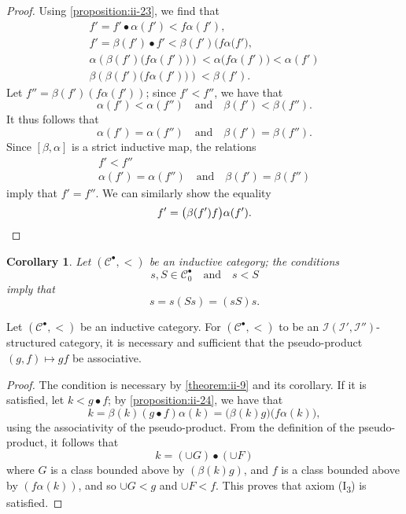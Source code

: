 \documentclass[a4paper,fleqn]{article}
\theoremstyle{plain}
\newenvironment{proposition}[1]
  {\renewcommand\theinnerproposition{#1}\innerproposition}
  {\endinnerproposition}
\newtheorem*{corollary*}{Corollary}
\theoremstyle{definition}
\newcommand{\oldpage}[1]{{\marginpar{\footnotesize$\bigg\vert$\,\,\,\,\textit{p.~#1}}}}
\newcommand{\textand}{\quad\text{and}\quad}
\newcommand{\CC}{\mathcal{C}}
\newcommand{\II}{\mathcal{I}}
\begin{document}
\begin{proof}
  Using \cref{proposition:ii-23}, we find that
  \[
    \begin{gathered}
      f'
      = f'\bullet\alpha(f')
      < f\alpha(f'),
    \\f'
      = \beta(f')\bullet f'
      < \beta(f')\big(f\alpha(f'\big),
    \\\alpha\left(\beta(f')\big(f\alpha(f')\big)\right)
      < \alpha\big(f\alpha(f')\big)
      < \alpha(f')
    \\\beta\left(\beta(f')\big(f\alpha(f')\big)\right)
      < \beta(f').
    \end{gathered}
  \]
  Let $f''=\beta(f')(f\alpha(f'))$;
  since $f'<f''$, we have that
  \[
    \alpha(f')<\alpha(f'')
    \textand
    \beta(f')<\beta(f'').
  \]
  It thus follows that
  \[
    \alpha(f')=\alpha(f'')
    \textand
    \beta(f')=\beta(f'').
  \]
  Since $[\beta,\alpha]$ is a strict inductive map, the relations
  \[
    \begin{gathered}
      f'<f''
    \\\alpha(f')=\alpha(f'')
      \textand
      \beta(f')=\beta(f'')
    \end{gathered}
  \]
  \oldpage{407}
  imply that $f'=f''$.
  We can similarly show the equality
  \[
    f'
    = \big(\beta(f')f\big)\alpha(f').
    \qedhere
  \]
\end{proof}

\begin{corollary*}
  Let $(\CC^\bullet,<)$ be an inductive category;
  the conditions
  \[
    s,S\in\CC_0^\bullet
    \textand
    s<S
  \]
  imply that
  \[
    s
    = s(Ss)
    = (sS)s.
  \]
\end{corollary*}

\begin{proposition}{25}
\label{proposition:ii-25}
  Let $(\CC^\bullet,<)$ be an inductive category.
  For $(\CC^\bullet,<)$ to be an $\II(\II',\II'')$-structured category, it is necessary and sufficient that the pseudo-product $(g,f)\mapsto gf$ be associative.
\end{proposition}

\begin{proof}
  The condition is necessary by \cref{theorem:ii-9} and its corollary.
  If it is satisfied, let $k<g\bullet f$;
  by \cref{proposition:ii-24}, we have that
  \[
    k
    = \beta(k)(g\bullet f)\alpha(k)
    = \big(\beta(k)g\big)\big(f\alpha(k)\big),
  \]
  using the associativity of the pseudo-product.
  From the definition of the pseudo-product, it follows that
  \[
    k
    = (\cup G)\bullet(\cup F)
  \]
  where $G$ is a class bounded above by $(\beta(k)g)$, and $f$ is a class bounded above by $(f\alpha(k))$, and so $\cup G<g$ and $\cup F<f$.
  This proves that axiom (I\textquotesingle\!\textsubscript{3}) is satisfied.
\end{proof}
\end{document}
